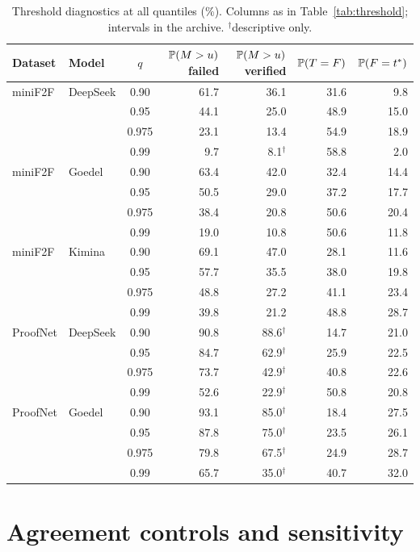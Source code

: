 \begin{table}[h]
\caption{Threshold diagnostics at all quantiles (\%). Columns as in Table~\ref{tab:threshold}; intervals in the archive. $^\dagger$descriptive only.}
\label{tab:allq}
\begin{center}
\small
\begin{tabular}{llcrrrr}
\toprule
Dataset & Model & $q$ & $\mathbb{P}(M>u)$ failed & $\mathbb{P}(M>u)$ verified & $\mathbb{P}(T=F)$ & $\mathbb{P}(F=t^*)$\\
\midrule
miniF2F & DeepSeek & 0.90 & 61.7 & 36.1 & 31.6 & 9.8\\
 & & 0.95 & 44.1 & 25.0 & 48.9 & 15.0\\
 & & 0.975 & 23.1 & 13.4 & 54.9 & 18.9\\
 & & 0.99 & 9.7 & 8.1$^\dagger$ & 58.8 & 2.0\\
miniF2F & Goedel & 0.90 & 63.4 & 42.0 & 32.4 & 14.4\\
 & & 0.95 & 50.5 & 29.0 & 37.2 & 17.7\\
 & & 0.975 & 38.4 & 20.8 & 50.6 & 20.4\\
 & & 0.99 & 19.0 & 10.8 & 50.6 & 11.8\\
miniF2F & Kimina & 0.90 & 69.1 & 47.0 & 28.1 & 11.6\\
 & & 0.95 & 57.7 & 35.5 & 38.0 & 19.8\\
 & & 0.975 & 48.8 & 27.2 & 41.1 & 23.4\\
 & & 0.99 & 39.8 & 21.2 & 48.8 & 28.7\\
ProofNet & DeepSeek & 0.90 & 90.8 & 88.6$^\dagger$ & 14.7 & 21.0\\
 & & 0.95 & 84.7 & 62.9$^\dagger$ & 25.9 & 22.5\\
 & & 0.975 & 73.7 & 42.9$^\dagger$ & 40.8 & 22.6\\
 & & 0.99 & 52.6 & 22.9$^\dagger$ & 50.8 & 20.8\\
ProofNet & Goedel & 0.90 & 93.1 & 85.0$^\dagger$ & 18.4 & 27.5\\
 & & 0.95 & 87.8 & 75.0$^\dagger$ & 23.5 & 26.1\\
 & & 0.975 & 79.8 & 67.5$^\dagger$ & 24.9 & 28.7\\
 & & 0.99 & 65.7 & 35.0$^\dagger$ & 40.7 & 32.0\\
\bottomrule
\end{tabular}
\end{center}
\end{table}

\section{Agreement controls and sensitivity}\label{app:agreement}

